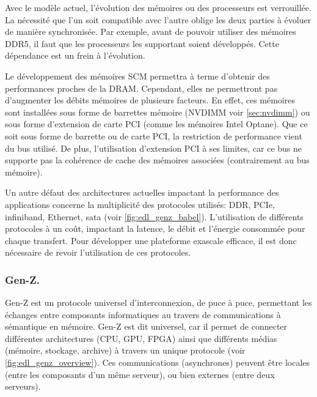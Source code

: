         Avec le modèle actuel, l'évolution des mémoires ou des processeurs est verrouillée. La nécessité que l'un soit compatible avec l'autre oblige les deux parties à évoluer de manière synchronisée. Par exemple, avant de pouvoir utiliser des mémoires DDR5, il faut que les processeurs les supportant soient développés. Cette dépendance est un frein à l'évolution.
        
        Le développement des mémoires SCM permettra à terme d'obtenir des performances proches de la DRAM. Cependant, elles ne permettront pas d'augmenter les débits mémoires de plusieurs facteurs. En effet, ces mémoires sont installées sous forme de barrettes mémoire (NVDIMM voir \autoref{sec:nvdimm}) ou sous forme d'extension de carte PCI (comme les mémoires Intel Optane). Que ce soit sous forme de barrette ou de carte PCI, la restriction de performance vient du bus utilisé. De plus, l'utilisation d'extension PCI à ses limites, car ce bus ne supporte pas la cohérence de cache des mémoires associées (contrairement au bus mémoire).

        Un autre défaut des architectures actuelles impactant la performance des applications concerne la multiplicité des protocoles utilisés: DDR, PCIe, infiniband, Ethernet, sata (voir \autoref{fig:edl_genz_babel}). L'utilisation de différents protocoles à un coût, impactant la latence, le débit et l'énergie consommée pour chaque transfert. Pour développer une plateforme exascale efficace, il est donc nécessaire de revoir l'utilisation de ces protocoles.
            
           
        
   
    
    \subsubsection{Gen-Z.}
        
        Gen-Z est un protocole universel d'interconnexion, de puce à puce, permettant les échanges entre composants informatiques au travers de communications à sémantique en mémoire. Gen-Z est dit universel, car il permet de connecter différentes architectures (CPU, GPU, FPGA) ainsi que différents médias (mémoire, stockage, archive) à travers un unique protocole (voir \autoref{fig:edl_genz_overview}). Ces communications (asynchrones) peuvent être locales (entre les composants d'un même serveur), ou bien externes (entre deux serveurs). 



